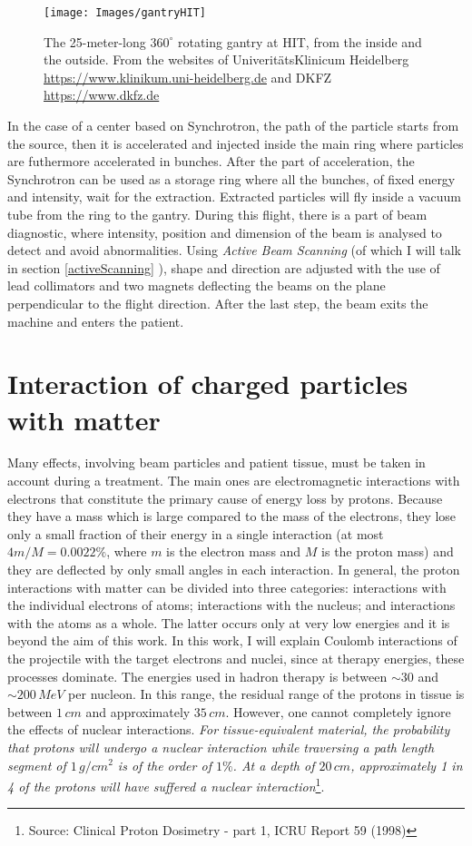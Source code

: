 \documentclass[12pt, a4paper, twoside]{book}
\begin{document}
\begin{figure}[t]
\texttt{[image: Images/gantryHIT]}
\caption{The 25-meter-long $360^\circ$ rotating gantry at HIT, from the inside and the outside. From the websites of Univerit\"atsKlinicum Heidelberg \url{https://www.klinikum.uni-heidelberg.de} and DKFZ \url{https://www.dkfz.de}}
\label{fig:HIT}
\end{figure}

In the case of a center based on Synchrotron, the path of the particle starts from the source, then it is accelerated and injected inside the main ring where particles are futhermore accelerated in bunches. After the part of acceleration, the Synchrotron can be used as a storage ring where all the bunches, of fixed energy and intensity, wait for the extraction. Extracted particles will fly inside a vacuum tube from the ring to the gantry. During this flight, there is a part of beam diagnostic, where intensity, position and dimension of the beam is analysed to detect and avoid abnormalities. Using \emph{Active Beam Scanning} (of which I will talk in section \ref{activeScanning} ), shape and direction are adjusted with the use of lead collimators and two magnets deflecting the beams on the plane perpendicular to the flight direction. After the last step, the beam exits the machine and enters the patient.

\section{Interaction of charged particles with matter}
Many effects, involving beam particles and patient tissue, must be taken in account during a treatment.
The main ones are electromagnetic interactions with electrons that constitute the primary cause of energy loss by protons. Because they have a mass which is large compared to the mass of the electrons, they lose only a small fraction of their energy in a single interaction (at most $4 m/M = 0.0022\%$, where $m$ is the electron mass and $M$ is the proton mass) and they are deflected by only small angles in each interaction.
In general, the proton interactions with matter can be divided into three categories: interactions with the individual electrons of atoms; interactions with the nucleus; and interactions with the atoms as a whole. The latter occurs only at very low energies and it is beyond the aim of this work. In this work, I will explain Coulomb interactions of the projectile with the target electrons and nuclei, since at therapy energies, these processes dominate.  
The energies used in hadron therapy is between $\sim30$ and $\sim200\,MeV$ per nucleon. 
In this range, the residual range of the protons in tissue is between $1\,cm$ and approximately $35\,cm$. However, one cannot completely ignore the effects of nuclear interactions. \emph{For tissue-equivalent material, the probability that protons will undergo a nuclear interaction while traversing a path length segment of $1\,g/cm^{2}$ is of the order of $1\%$. At a depth of $20\,cm$, approximately 1 in 4 of the protons will have suffered a nuclear interaction}\footnote{Source: Clinical Proton Dosimetry - part 1, ICRU Report 59 (1998)}. 
\end{document}
